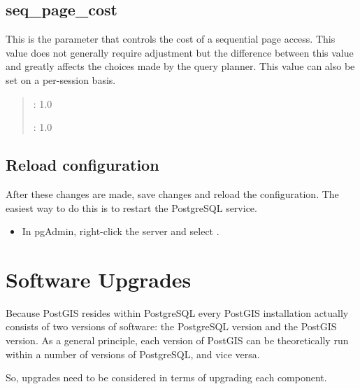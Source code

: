 \documentclass[a4paper,11pt,english]{sphinxmanual}
\begin{document}
\noindent{}


\subsection{seq\_page\_cost}
\label{\detokenize{maintenance:seq-page-cost}}
This is the parameter that controls the cost of a sequential page access.  This value does not generally require adjustment but the difference between this value and  greatly affects the choices made by the query planner.  This value can also be set on a per-session basis.
\begin{quote}

: 1.0

: 1.0
\end{quote}

\noindent{}


\subsection{Reload configuration}
\label{\detokenize{maintenance:reload-configuration}}
After these changes are made, save changes and reload the configuration. The easiest way to do this is to restart the PostgreSQL service.
\begin{itemize}
\item {} 
In pgAdmin, right-click the server  and select .

\end{itemize}


\section{Software Upgrades}
\label{\detokenize{maintenance:software-upgrades}}\label{\detokenize{maintenance:upgrades}}
Because PostGIS resides within PostgreSQL every PostGIS installation actually consists of two versions of software: the PostgreSQL version and the PostGIS version.  As a general principle, each version of PostGIS can be theoretically run within a number of versions of PostgreSQL, and vice versa.

So, upgrades need to be considered in terms of upgrading each component.
\end{document}
